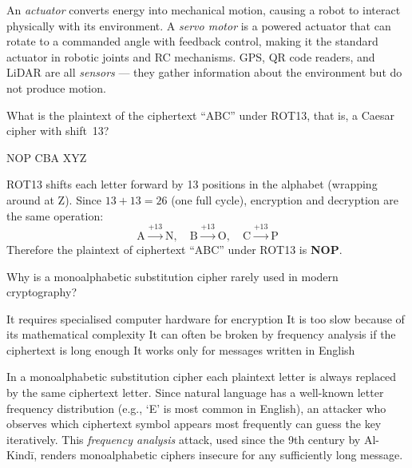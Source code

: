 \documentclass[answers]{exam}
\begin{document}
\begin{questions}
\begin{solution}
    An \textit{actuator} converts energy into mechanical motion, causing a robot to interact physically with its environment.
    A \textit{servo motor} is a powered actuator that can rotate to a commanded angle with feedback control, making it the standard actuator in robotic joints and RC mechanisms.
    GPS, QR code readers, and LiDAR are all \textit{sensors} --- they gather information about the environment but do not produce motion.
\end{solution}

\question What is the plaintext of the ciphertext ``ABC'' under ROT13, that is, a Caesar cipher with shift~13?

\begin{oneparchoices}
    \correctchoice NOP
    \choice CBA
    \choice XYZ
\end{oneparchoices}

\begin{solution}
    ROT13 shifts each letter forward by 13 positions in the alphabet (wrapping around at Z).
    Since $13 + 13 = 26$ (one full cycle), encryption and decryption are the same operation:
    \[
        \text{A} \xrightarrow{+13} \text{N}, \quad
        \text{B} \xrightarrow{+13} \text{O}, \quad
        \text{C} \xrightarrow{+13} \text{P}
    \]
    Therefore the plaintext of ciphertext ``ABC'' under ROT13 is \textbf{NOP}.
\end{solution}

\question Why is a monoalphabetic substitution cipher rarely used in modern cryptography?

\begin{choices}
    \choice It requires specialised computer hardware for encryption
    \choice It is too slow because of its mathematical complexity
    \correctchoice It can often be broken by frequency analysis if the ciphertext is long enough
    \choice It works only for messages written in English
\end{choices}

\begin{solution}
    In a monoalphabetic substitution cipher each plaintext letter is always replaced by the same ciphertext letter.
    Since natural language has a well-known letter frequency distribution (e.g., `E' is most common in English), an attacker who observes which ciphertext symbol appears most frequently can guess the key iteratively.
    This \textit{frequency analysis} attack, used since the 9th century by Al-Kind\={i}, renders monoalphabetic ciphers insecure for any sufficiently long message.
\end{solution}


\end{questions}
\end{document}
